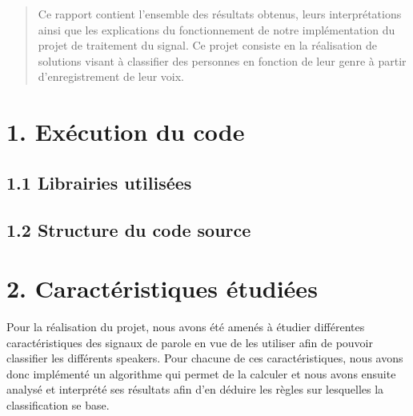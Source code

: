 \documentclass[a4paper,12pt]{report}	%
\begin{document}
\umonsCoverPage		%
	

\begin{abstract}
Ce rapport contient l'ensemble des résultats obtenus, leurs interprétations ainsi que les explications du fonctionnement de notre implémentation du projet de traitement du signal. Ce projet consiste en la réalisation de solutions visant à classifier des personnes en fonction de leur genre à partir d'enregistrement de leur voix.
\end{abstract}

\clearpage		
\tableofcontents

\clearpage		
{}

{\section*{1. Exécution du code}}
{\subsection*{1.1 Librairies utilisées}}
{\subsection*{1.2 Structure du code source}}

{\section*{2. Caractéristiques étudiées}}
Pour la réalisation du projet, nous avons été amenés à étudier différentes caractéristiques des signaux de parole en vue de les utiliser afin de pouvoir classifier les différents speakers. Pour chacune de ces caractéristiques, nous avons donc implémenté un algorithme qui permet de la calculer et nous avons ensuite analysé et interprété ses résultats afin d'en déduire les règles sur lesquelles la classification se base.
\end{document}
